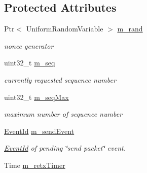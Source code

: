 \subsection*{Protected Attributes}
\begin{DoxyCompactItemize}
\item 
Ptr$<$ Uniform\+Random\+Variable $>$ \hyperlink{classns3_1_1ndn_1_1Subscriber_a6e1211634925b991222ec302aef42e3d}{m\+\_\+rand}\hypertarget{classns3_1_1ndn_1_1Subscriber_a6e1211634925b991222ec302aef42e3d}{}\label{classns3_1_1ndn_1_1Subscriber_a6e1211634925b991222ec302aef42e3d}

\begin{DoxyCompactList}\small\item\em nonce generator \end{DoxyCompactList}\item 
uint32\+\_\+t \hyperlink{classns3_1_1ndn_1_1Subscriber_a2463400a9d405c40e53e76f5c89c25f4}{m\+\_\+seq}\hypertarget{classns3_1_1ndn_1_1Subscriber_a2463400a9d405c40e53e76f5c89c25f4}{}\label{classns3_1_1ndn_1_1Subscriber_a2463400a9d405c40e53e76f5c89c25f4}

\begin{DoxyCompactList}\small\item\em currently requested sequence number \end{DoxyCompactList}\item 
uint32\+\_\+t \hyperlink{classns3_1_1ndn_1_1Subscriber_ad7bfdbbf64b30afeb916a46dc7344303}{m\+\_\+seq\+Max}\hypertarget{classns3_1_1ndn_1_1Subscriber_ad7bfdbbf64b30afeb916a46dc7344303}{}\label{classns3_1_1ndn_1_1Subscriber_ad7bfdbbf64b30afeb916a46dc7344303}

\begin{DoxyCompactList}\small\item\em maximum number of sequence number \end{DoxyCompactList}\item 
\hyperlink{classEventId}{Event\+Id} \hyperlink{classns3_1_1ndn_1_1Subscriber_a660f56f69bed601435b1264388a9feee}{m\+\_\+send\+Event}\hypertarget{classns3_1_1ndn_1_1Subscriber_a660f56f69bed601435b1264388a9feee}{}\label{classns3_1_1ndn_1_1Subscriber_a660f56f69bed601435b1264388a9feee}

\begin{DoxyCompactList}\small\item\em \hyperlink{classEventId}{Event\+Id} of pending \char`\"{}send packet\char`\"{} event. \end{DoxyCompactList}\item 
Time \hyperlink{classns3_1_1ndn_1_1Subscriber_a396207bf0eb311c18d375a7df717da7d}{m\+\_\+retx\+Timer}\hypertarget{classns3_1_1ndn_1_1Subscriber_a396207bf0eb311c18d375a7df717da7d}{}\label{classns3_1_1ndn_1_1Subscriber_a396207bf0eb311c18d375a7df717da7d}


\end{DoxyCompactItemize}
